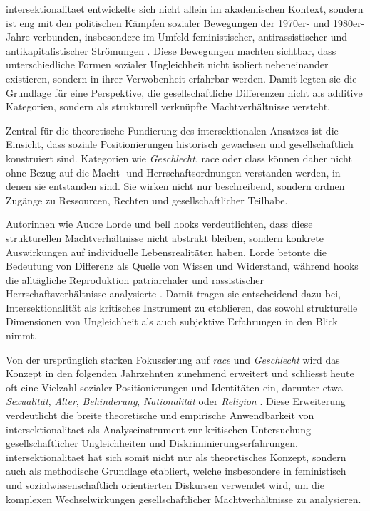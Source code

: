 \gls{intersektionalitaet} entwickelte sich nicht allein im akademischen Kontext, sondern ist eng mit den politischen Kämpfen sozialer Bewegungen der 1970er- und 1980er-Jahre verbunden, insbesondere im Umfeld feministischer, antirassistischer und antikapitalistischer Strömungen \parencite{collinsBlackFeministThought2002}. Diese Bewegungen machten sichtbar, dass unterschiedliche Formen sozialer Ungleichheit nicht isoliert nebeneinander existieren, sondern in ihrer Verwobenheit erfahrbar werden. Damit legten sie die Grundlage für eine Perspektive, die gesellschaftliche Differenzen nicht als additive Kategorien, sondern als strukturell verknüpfte Machtverhältnisse versteht.

Zentral für die theoretische Fundierung des intersektionalen Ansatzes ist die Einsicht, dass soziale Positionierungen historisch gewachsen und gesellschaftlich konstruiert sind. Kategorien wie \emph{Geschlecht}, \gls{race} oder \gls{class} können daher nicht ohne Bezug auf die Macht- und Herrschaftsordnungen verstanden werden, in denen sie entstanden sind. Sie wirken nicht nur beschreibend, sondern ordnen Zugänge zu Ressourcen, Rechten und gesellschaftlicher Teilhabe.

Autorinnen wie Audre Lorde und bell hooks verdeutlichten, dass diese strukturellen Machtverhältnisse nicht abstrakt bleiben, sondern konkrete Auswirkungen auf individuelle Lebensrealitäten haben. Lorde betonte die Bedeutung von Differenz als Quelle von Wissen und Widerstand, während hooks die alltägliche Reproduktion patriarchaler und rassistischer Herrschaftsverhältnisse analysierte \parencite{collinsBlackFeministThought2002, hancockWhenMultiplicationDoesnt2007}. Damit tragen sie entscheidend dazu bei, Intersektionalität als kritisches Instrument zu etablieren, das sowohl strukturelle Dimensionen von Ungleichheit als auch subjektive Erfahrungen in den Blick nimmt.

Von der ursprünglich starken Fokussierung auf \textit{race} und \emph{Geschlecht} wird das Konzept in den folgenden Jahrzehnten zunehmend erweitert und schliesst heute oft eine Vielzahl sozialer Positionierungen und Identitäten ein, darunter etwa \emph{Sexualität}, \emph{Alter}, \emph{Behinderung}, \emph{Nationalität} oder \emph{Religion} \parencite{bauerIntersectionalityQuantitativeResearch2021, bowlegInvitedReflectionQuantifying2016}. Diese Erweiterung verdeutlicht die breite theoretische und empirische Anwendbarkeit von \gls{intersektionalitaet} als Analyseinstrument zur kritischen Untersuchung gesellschaftlicher Ungleichheiten und Diskriminierungserfahrungen. \gls{intersektionalitaet} hat sich somit nicht nur als theoretisches Konzept, sondern auch als methodische Grundlage etabliert, welche insbesondere in feministisch und sozialwissenschaftlich orientierten Diskursen verwendet wird, um die komplexen Wechselwirkungen gesellschaftlicher Machtverhältnisse zu analysieren.

